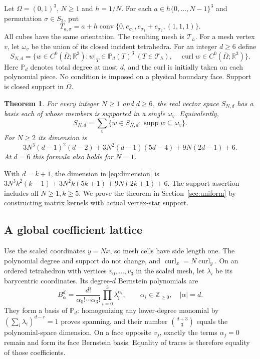 \documentclass[11pt]{article}
\newtheorem{theorem}{Theorem}[section]
\theoremstyle{remark}
\DeclareMathOperator{\curl}{curl}
\DeclareMathOperator{\supp}{supp}
\DeclareMathOperator{\conv}{conv}
\newcommand{\R}{\mathbb R}
\newcommand{\Z}{\mathbb Z}
\newcommand{\PP}{\mathbb P}
\newcommand{\calT}{\mathcal T}
\begin{document}
Let $\Omega=(0,1)^3$, $N\ge1$ and $h=1/N$. For each
$a\in h\{0,\ldots,N-1\}^3$ and permutation $\sigma\in S_3$, put
\begin{equation}\label{eq:mesh}
 T_{a,\sigma}=a+h\conv\{0,e_{\sigma_1},
                         e_{\sigma_1}+e_{\sigma_2},(1,1,1)\}.
\end{equation}
All cubes have the same orientation. The resulting mesh is $\calT_h$.
For a mesh vertex $v$, let $\omega_v$ be the union of its closed incident
tetrahedra. For an integer $d\ge6$ define
\begin{equation}\label{eq:space}
 S_{N,d}=\{w\in C^0(\overline\Omega;\R^3):
 w|_T\in\PP_d(T)^3\ (T\in\calT_h),\quad
 \curl w\in C^0(\overline\Omega;\R^3)\}.
\end{equation}
Here $\PP_d$ denotes total degree at most $d$, and the curl is initially
taken on each polynomial piece. No condition is imposed on a physical
boundary face. Support is closed support in $\overline\Omega$.

\begin{theorem}\label{thm:main}
For every integer $N\ge1$ and $d\ge6$, the real vector space $S_{N,d}$
has a basis each of whose members is supported in a single $\omega_v$.
Equivalently,
\begin{equation}\label{eq:decomposition}
 S_{N,d}=\sum_v\{w\in S_{N,d}:\supp w\subseteq\omega_v\}.
\end{equation}
For $N\ge2$ its dimension is
\begin{equation}\label{eq:dimension}
 3N^3(d-1)^2(d-2)+3N^2(d-1)(5d-4)+9N(2d-1)+6.
\end{equation}
At $d=6$ this formula also holds for $N=1$.
\end{theorem}

With $d=k+1$, the dimension in \eqref{eq:dimension} is
$3N^3k^2(k-1)+3N^2k(5k+1)+9N(2k+1)+6$. The support assertion
includes all $N\ge1,k\ge5$. We prove the theorem in
Section~\ref{sec:uniform} by constructing matrix kernels with actual
vertex-star support.

\subsection{A global coefficient lattice}

Use the scaled coordinates $y=Nx$, so mesh cells have side length one.
The polynomial degree and support do not change, and
$\curl_x=N\curl_y$. On an ordered tetrahedron with vertices
$v_0,\ldots,v_3$ in the scaled mesh, let $\lambda_i$ be its barycentric
coordinates. Its degree-$d$ Bernstein polynomials are
\[
 B^d_\alpha=\frac{d!}{\alpha_0!\cdots\alpha_3!}
             \prod_{i=0}^3\lambda_i^{\alpha_i},
 \qquad \alpha_i\in\Z_{\ge0},\quad |\alpha|=d.
\]
They form a basis of $\PP_d$: homogenizing any lower-degree monomial by
$(\sum_i\lambda_i)^{d-r}=1$ proves spanning, and their number
$\binom{d+3}{3}$ equals the polynomial-space dimension. On a face opposite
$v_j$, exactly the terms $\alpha_j=0$ remain and form its face Bernstein
basis. Equality of traces is therefore equality of those coefficients.
\end{document}
